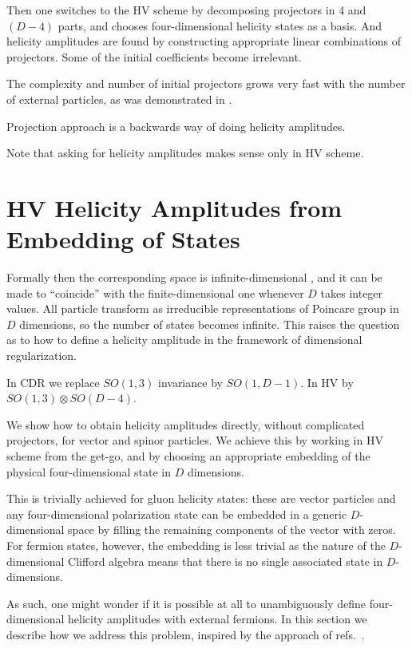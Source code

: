 Then one switches to the HV scheme by decomposing projectors in $4$ and $(D-4)$ parts,
and chooses four-dimensional helicity states as a basis.
And helicity amplitudes are found by constructing appropriate linear combinations of projectors.
Some of the initial coefficients become irrelevant.

The complexity and number of initial projectors grows very fast with the number of external particles, as was demonstrated in \cite{Peraro:2019cjj}.

Projection approach is a backwards way of doing helicity amplitudes.

Note that asking for helicity amplitudes makes sense only in HV scheme.


\section{HV Helicity Amplitudes from Embedding of States}
\label{sec:helampl_embeding}


Formally then the corresponding space is infinite-dimensional , and
it can be made to ``coincide'' with the finite-dimensional one whenever $D$ takes integer values.
All particle transform as irreducible representations of Poincare group in $D$ dimensions,
so the number of states becomes infinite.
This raises the question as to how to define a helicity amplitude in the framework of dimensional regularization.

In CDR we replace $SO(1,3)$ invariance by $SO(1,D-1)$.
In HV by $SO(1,3)\otimes SO(D-4)$.




We show how to obtain helicity amplitudes directly, without complicated projectors,
for vector and spinor particles.
We achieve this by working in HV scheme from the get-go, and by
choosing an appropriate embedding of the physical four-dimensional state in $D$ dimensions.

This is trivially achieved for gluon helicity states: these
are vector particles and any four-dimensional polarization state
can be embedded in a generic $D$-dimensional space by filling 
the remaining components of the vector with zeros. 
For fermion states, however, the embedding is less trivial as 
the nature of the $D$-dimensional Clifford algebra means that
there is no single associated state in $D$-dimensions.  

As such, one might wonder if it is possible at all to unambiguously 
define four-dimensional helicity amplitudes with external
fermions. In this section we describe how we
address this problem, inspired by the approach of
refs.~\cite{Glover:2003cm,Glover:2004si}.
 
